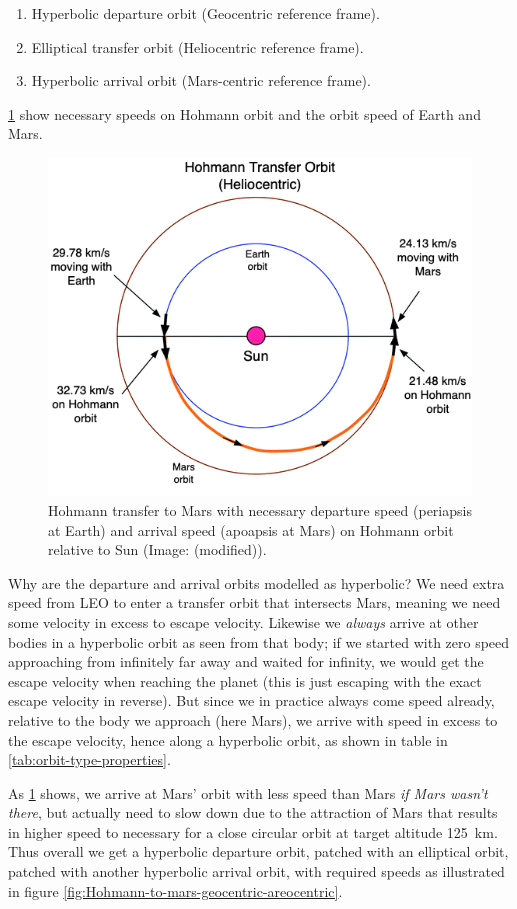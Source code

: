 \begin{enumerate}
	\item Hyperbolic departure orbit (Geocentric reference frame).
	\item Elliptical transfer orbit (Heliocentric reference frame).
	\item Hyperbolic arrival orbit (Mars-centric reference frame).
\end{enumerate}
\cref{fig:Hohmann-to-mars-heliocentric} show necessary speeds on Hohmann orbit and the orbit speed of Earth and Mars. 
\begin{figure}[ht]
    \centering
    \includegraphics[width=0.7\linewidth]{fig/Hohmann-to-mars-heliocentric.png}
    \caption{Hohmann transfer to Mars with necessary departure speed (periapsis at Earth) and arrival speed (apoapsis at Mars) on Hohmann orbit relative to Sun (Image: \cite[p.~127]{Rapp2016} (modified)).}
    \label{fig:Hohmann-to-mars-heliocentric}
\end{figure}
Why are the departure and arrival orbits modelled as hyperbolic? We need extra speed from LEO to enter a transfer orbit that intersects Mars, meaning we need some velocity in excess to escape velocity. Likewise we \emph{always} arrive at other bodies in a hyperbolic orbit as seen from that body; if we started with zero speed approaching from infinitely far away and waited for infinity, we would get the escape velocity when reaching the planet (this is just escaping with the exact escape velocity in reverse). But since we in practice always come speed already, relative to the body we approach (here Mars), we arrive with speed in excess to the escape velocity, hence along a hyperbolic orbit, as shown in table in \cref{tab:orbit-type-properties}.

As \cref{fig:Hohmann-to-mars-heliocentric} shows, we arrive at Mars' orbit with less speed than Mars \emph{if Mars wasn't there}, but actually need to slow down due to the attraction of Mars that results in higher speed to necessary for a close circular orbit at target altitude \SI{125}{\km}. Thus overall we get a hyperbolic departure orbit, patched with an elliptical orbit, patched with another hyperbolic arrival orbit, with required speeds as illustrated in figure \cref{fig:Hohmann-to-mars-geocentric-areocentric}.

